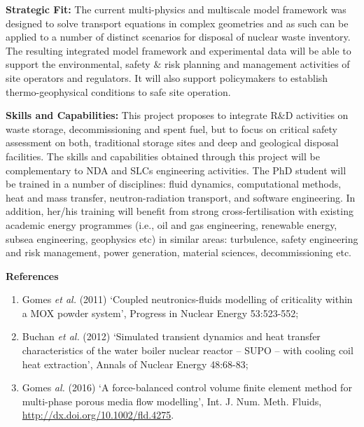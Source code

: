 \documentclass[12pts,a4paper,amsmath,amssymb,floatfix]{article}%
\begin{document}
\begin{enumerate}[label=\bfseries Project: \arabic*:]
{\bf Strategic Fit:} The current multi-physics and multiscale model framework was designed to solve transport equations in complex geometries and as such can be applied to a number of distinct scenarios for disposal of nuclear waste inventory. The resulting integrated model framework and experimental data will be able to support the environmental, safety $\&$ risk planning and management activities of site operators and regulators. It will also support policymakers to establish thermo-geophysical conditions to safe site operation.

{\bf Skills and Capabilities:} This project proposes to integrate R$\&$D activities on waste storage, decommissioning and spent fuel, but to focus on critical safety assessment on both, traditional storage sites and deep and geological disposal facilities. The skills and capabilities obtained through this project will be complementary to NDA and SLCs engineering activities.  The PhD student will be trained in a number of disciplines: fluid dynamics, computational methods, heat and mass transfer, neutron-radiation transport, and software engineering. In addition, her/his training will benefit from strong cross-fertilisation with existing academic energy programmes (i.e., oil and gas engineering, renewable energy, subsea engineering, geophysics etc) in similar areas: turbulence, safety engineering and risk management, power generation, material sciences, decommissioning etc.

{\bf References}
\begin{enumerate}
   \item Gomes {\it et al.} (2011) `Coupled neutronics-fluids modelling of criticality within a MOX powder system', Progress in Nuclear Energy 53:523-552;
   \item Buchan {\it et al.} (2012) `Simulated transient dynamics and heat transfer characteristics of the water boiler nuclear reactor – SUPO – with cooling coil heat extraction', Annals of Nuclear Energy 48:68-83;
   \item Gomes {\it al.} (2016) `A force-balanced control volume finite element method for multi-phase porous media flow modelling', Int. J. Num. Meth. Fluids, \href{http://dx.doi.org/10.1002/fld.4275}{http://dx.doi.org/10.1002/fld.4275}.

\end{enumerate}



\end{enumerate}


\end{document}
